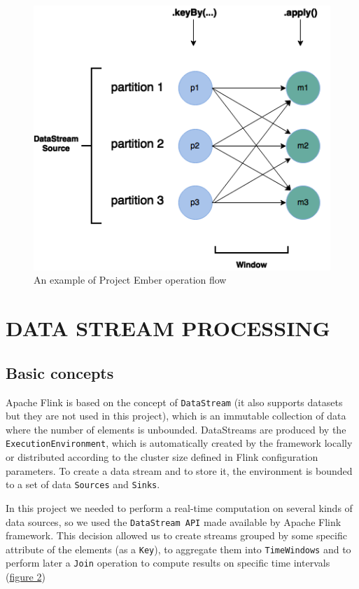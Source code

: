 \begin{figure}
\begin{center}
	\includegraphics[scale=0.40]{img/ember_keyedstream}
	\caption{An example of Project Ember operation flow}
	\label{fig:ember_operation_flow}
\end{center}
\end{figure}


\section{DATA STREAM PROCESSING}

\subsection{Basic concepts}
Apache Flink is based on the concept of \texttt{DataStream} (it also supports datasets but they are not used in this project), which is an immutable collection of data where the number of elements is unbounded. 
DataStreams are produced by the \texttt{ExecutionEnvironment}, which is automatically created by the framework locally or distributed according to the cluster size defined in Flink configuration parameters. To create a data stream and to store it, the environment is bounded to a set of data \texttt{Sources} and \texttt{Sinks}.

In this project we needed to perform a real-time computation on several kinds of data sources, so we used the \texttt{DataStream API} made available by Apache Flink framework. This decision allowed us to create streams grouped by some specific attribute of the elements (as a \texttt{Key}), to aggregate them into \texttt{TimeWindows} and to perform later a \texttt{Join} operation to compute results on specific time intervals (\hyperref[fig:ember_keyedstream]{figure 2})

